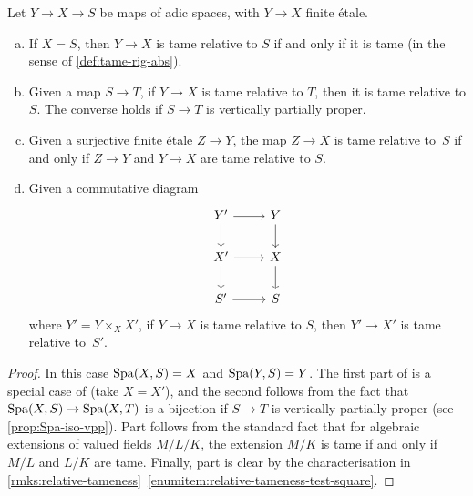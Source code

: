 \begin{lem} \label{lem:properties-tameness-relative-S}
    Let $Y\to X\to S$ be maps of adic spaces, with $Y\to X$ finite \'etale. 
    \begin{enumerate}[(a)]
        \item \label{lemitem:sorite-tameness-relative-S1}
        If $X=S$, then $Y\to X$ is tame relative to $S$ if and only if it is tame (in the sense of \cref{def:tame-rig-abs}).
        \item \label{lemitem:sorite-tameness-relative-S2}
        Given a map $S\to T$, if $Y\to X$ is tame relative to $T$, then it is tame relative to $S$. The converse holds if $S\to T$ is vertically partially proper.
        \item 
        \label{lemitem:sorite-tameness-relative-S3}
        Given a surjective finite \'etale $Z\to Y$, the map $Z \to X$ is tame relative to~$S$ if and only if $Z\to Y$ and $Y\to X$ are tame relative to $S$. 
        \item 
        \label{lemitem:sorite-tameness-relative-S4}
        Given a commutative diagram
        \[ 
            \begin{tikzcd}
                Y'\ar[r] \ar[d] & Y \ar[d] \\
                X'\ar[r] \ar[d] & X \ar[d] \\
                S'\ar[r]  & S
            \end{tikzcd}
        \]
        where $Y' = Y\times_X X'$, if $Y\to X$ is tame relative to $S$, then $Y'\to X'$ is tame relative to~$S'$.
    \end{enumerate}    
\end{lem}

\begin{proof}
 In this case $\operatorname{Spa}(X, S) = X$ and $\operatorname{Spa}(Y,S) = Y$.
The first part of  is a special case of  (take  $X=X'$), and the second follows from the fact that $\operatorname{Spa}(X, S)\to \operatorname{Spa}(X, T)$ is a bijection if $S\to T$ is vertically partially proper (see \cref{prop:Spa-iso-vpp}).
Part  follows from the standard fact that for algebraic extensions of valued fields $M/L/K$, the extension $M/K$ is tame if and only if $M/L$ and $L/K$ are tame. Finally, part  is clear by the characterisation in \cref{rmks:relative-tameness}~\ref{enumitem:relative-tameness-test-square}.
\end{proof}

